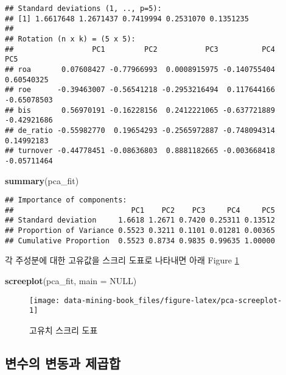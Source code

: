 \documentclass[]{book}
\newenvironment{Shaded}{\begin{snugshade}}{\end{snugshade}}
\newcommand{\DataTypeTok}[1]{\textcolor[rgb]{0.13,0.29,0.53}{#1}}
\newcommand{\KeywordTok}[1]{\textcolor[rgb]{0.13,0.29,0.53}{\textbf{#1}}}
\newcommand{\NormalTok}[1]{#1}
\newcommand{\OtherTok}[1]{\textcolor[rgb]{0.56,0.35,0.01}{#1}}
\begin{document}
\begin{verbatim}
## Standard deviations (1, .., p=5):
## [1] 1.6617648 1.2671437 0.7419994 0.2531070 0.1351235
## 
## Rotation (n x k) = (5 x 5):
##                  PC1         PC2           PC3          PC4         PC5
## roa       0.07608427 -0.77966993  0.0008915975 -0.140755404  0.60540325
## roe      -0.39463007 -0.56541218 -0.2953216494  0.117644166 -0.65078503
## bis       0.56970191 -0.16228156  0.2412221065 -0.637721889 -0.42921686
## de_ratio -0.55982770  0.19654293 -0.2565972887 -0.748094314  0.14992183
## turnover -0.44778451 -0.08636803  0.8881182665 -0.003668418 -0.05711464
\end{verbatim}

\begin{Shaded}
\begin{Highlighting}[]
\KeywordTok{summary}\NormalTok{(pca_fit)}
\end{Highlighting}
\end{Shaded}

\begin{verbatim}
## Importance of components:
##                           PC1    PC2    PC3     PC4     PC5
## Standard deviation     1.6618 1.2671 0.7420 0.25311 0.13512
## Proportion of Variance 0.5523 0.3211 0.1101 0.01281 0.00365
## Cumulative Proportion  0.5523 0.8734 0.9835 0.99635 1.00000
\end{verbatim}

각 주성분에 대한 고유값을 스크리 도표로 나타내면 아래 Figure \ref{fig:pca-screeplot}

\begin{Shaded}
\begin{Highlighting}[]
\KeywordTok{screeplot}\NormalTok{(pca_fit, }\DataTypeTok{main =} \OtherTok{NULL}\NormalTok{)}
\end{Highlighting}
\end{Shaded}

\begin{figure}

{\centering \texttt{[image: data-mining-book\_files/figure-latex/pca-screeplot-1]} 

}

\caption{고유치 스크리 도표}\label{fig:pca-screeplot}
\end{figure}

\hypertarget{pca-ss}{%
\subsection{변수의 변동과 제곱합}\label{pca-ss}}
\end{document}
